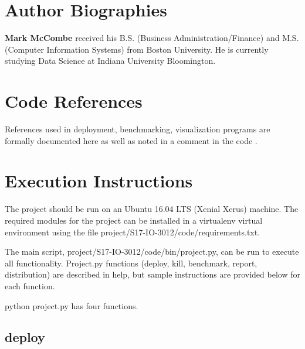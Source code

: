 \documentclass[9pt,twocolumn,twoside]{../../styles/osajnl}
\begin{document}

 
\section*{Author Biographies}
\begingroup
\setlength\intextsep{0pt}
\begin{minipage}[t][3.2cm][t]{1.0\columnwidth} %
  \noindent
{\bfseries Mark McCombe} received his B.S. (Business Administration/Finance) and M.S. (Computer Information Systems) from Boston University.  He is currently studying Data Science at Indiana University Bloomington.

\end{minipage}
\endgroup

\newpage

\appendix

\section{Code References}
References used in deployment, benchmarking, visualization programs are formally documented here as well as noted in a comment in the code \cite{www-bashNum} \cite{www-lastChar} \cite{www-configOpts} \cite{www-bashArgs} \cite{www-cmVms}  \cite{www-python1}  \cite{www-python2}  \cite{www-python3} \cite{www-ansibleDir} \cite{www-mongoAnsible} \cite{www-ansibleCopy} \cite{www-ansibleHost} \cite{www-installMongo} \cite{www-ansiblePython}.

\section{Execution Instructions}

The project should be run on an Ubuntu 16.04 LTS (Xenial Xerus)
machine. The required modules for the project can be installed in a
virtualenv virtual environment using the file
project/S17-IO-3012/code/requirements.txt.

The main script, project/S17-IO-3012/code/bin/project.py, can be run
to execute all functionality. Project.py functions (deploy, kill,
benchmark, report, distribution) are described in help, but sample
instructions are provided below for each function.

python project.py has four functions.

\subsection{deploy}
\end{document}
